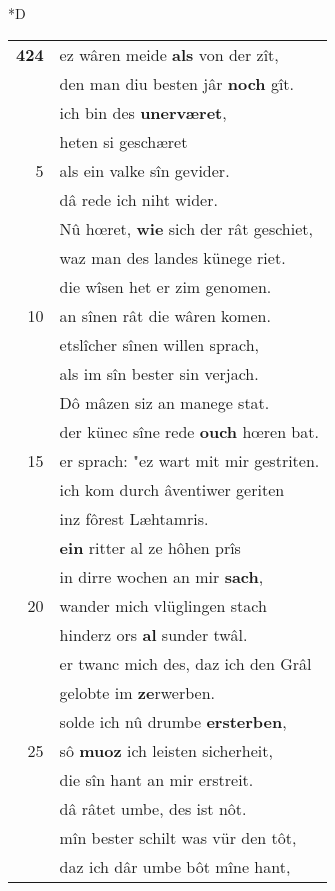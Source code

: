 \documentclass[8pt,a4paper,notitlepage]{article}
\begin{document}
\begin{table}[ht]
\begin{minipage}[t]{0.5\linewidth}
\small
\begin{center}*D
\end{center}
\begin{tabular}{rl}
\textbf{424} & ez wâren meide \textbf{als} von der zît,\\ 
 & den man diu besten jâr \textbf{noch} gît.\\ 
 & ich bin des \textbf{unerværet},\\ 
 & heten si geschæret\\ 
5 & als ein valke sîn gevider.\\ 
 & dâ rede ich niht wider.\\ 
 & Nû hœret, \textbf{wie} sich der rât geschiet,\\ 
 & waz man des landes künege riet.\\ 
 & die wîsen het er zim genomen.\\ 
10 & an sînen rât die wâren komen.\\ 
 & etslîcher sînen willen sprach,\\ 
 & als im sîn bester sin verjach.\\ 
 & Dô mâzen siz an manege stat.\\ 
 & der künec sîne rede \textbf{ouch} hœren bat.\\ 
15 & er sprach: "ez wart mit mir gestriten.\\ 
 & ich kom durch âventiwer geriten\\ 
 & inz fôrest Læhtamris.\\ 
 & \textbf{ein} ritter al ze hôhen prîs\\ 
 & in dirre wochen an mir \textbf{sach},\\ 
20 & wander mich vlüglingen stach\\ 
 & hinderz ors \textbf{al} sunder twâl.\\ 
 & er twanc mich des, daz ich den Grâl\\ 
 & gelobte im \textbf{ze}rwerben.\\ 
 & solde ich nû drumbe \textbf{ersterben},\\ 
25 & sô \textbf{muoz} ich leisten sicherheit,\\ 
 & die sîn hant an mir erstreit.\\ 
 & dâ râtet umbe, des ist nôt.\\ 
 & mîn bester schilt was vür den tôt,\\ 
 & daz ich dâr umbe bôt mîne hant,\\ 

\end{tabular}
\end{minipage}
\end{table}
\end{document}
